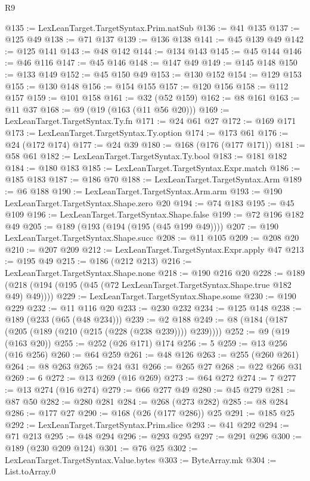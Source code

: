 \begin{lexlean}{R9}
\begin{coremodule}
@135 := LexLeanTarget.TargetSyntax.Prim.natSub
@136 := @41 @135
@137 := @125 @49
@138 := @71 @137
@139 := @136 @138
@141 := @45 @139 @49
@142 := @125 @141
@143 := @48 @142
@144 := @134 @143
@145 := @45 @144
@146 := @46 @116
@147 := @45 @146
@148 := @147 @49
@149 := @145 @148
@150 := @133 @149
@152 := @45 @150 @49
@153 := @130 @152
@154 := @129 @153
@155 := @130 @148
@156 := @154 @155
@157 := @120 @156
@158 := @112 @157
@159 := @101 @158
@161 := @32 (@52 @159)
@162 := @8 @161
@163 := @11 @37
@168 := @9 (@19 (@163 (@11 @56 @20)))
@169 := LexLeanTarget.TargetSyntax.Ty.fn
@171 := @24 @61 @27
@172 := @169 @171
@173 := LexLeanTarget.TargetSyntax.Ty.option
@174 := @173 @61
@176 := @24 (@172 @174)
@177 := @24 @39
@180 := @168 (@176 (@177 @171))
@181 := @58 @61
@182 := LexLeanTarget.TargetSyntax.Ty.bool
@183 := @181 @182
@184 := @180 @183
@185 := LexLeanTarget.TargetSyntax.Expr.match
@186 := @185 @183
@187 := @186 @70
@188 := LexLeanTarget.TargetSyntax.Arm
@189 := @6 @188
@190 := LexLeanTarget.TargetSyntax.Arm.arm
@193 := @190 LexLeanTarget.TargetSyntax.Shape.zero @20
@194 := @74 @183
@195 := @45 @109
@196 := LexLeanTarget.TargetSyntax.Shape.false
@199 := @72 @196 @182 @49
@205 := @189 (@193 (@194 (@195 (@45 @199 @49))))
@207 := @190 LexLeanTarget.TargetSyntax.Shape.succ
@208 := @11 @105
@209 := @208 @20
@210 := @207 @209
@212 := LexLeanTarget.TargetSyntax.Expr.apply @47
@213 := @195 @49
@215 := @186 (@212 @213)
@216 := LexLeanTarget.TargetSyntax.Shape.none
@218 := @190 @216 @20
@228 := @189 (@218 (@194 (@195 (@45 (@72 LexLeanTarget.TargetSyntax.Shape.true @182 @49) @49))))
@229 := LexLeanTarget.TargetSyntax.Shape.some
@230 := @190 @229
@232 := @11 @116 @20
@233 := @230 @232
@234 := @125 @148
@238 := @189 (@233 (@65 (@48 @234)))
@239 := @2 @188
@249 := @8 (@184 (@187 (@205 (@189 (@210 (@215 (@228 (@238 @239)))) @239))))
@252 := @9 (@19 (@163 @20))
@255 := @252 (@26 @171) @174
@256 := 5
@259 := @13 @256 (@16 @256)
@260 := @64 @259
@261 := @48 @126
@263 := @255 (@260 @261)
@264 := @8 @263
@265 := @24 @31
@266 := @265 @27
@268 := @22 @266 @31
@269 := 6
@272 := @13 @269 (@16 @269)
@273 := @64 @272
@274 := 7
@277 := @13 @274 (@16 @274)
@279 := @66 @277 @49
@280 := @45 @279
@281 := @87 @50
@282 := @280 @281
@284 := @268 (@273 @282)
@285 := @8 @284
@286 := @177 @27
@290 := @168 (@26 (@177 @286)) @25
@291 := @185 @25
@292 := LexLeanTarget.TargetSyntax.Prim.slice
@293 := @41 @292
@294 := @71 @213
@295 := @48 @294
@296 := @293 @295
@297 := @291 @296
@300 := @189 (@230 @209 @124)
@301 := @76 @25
@302 := LexLeanTarget.TargetSyntax.Value.bytes
@303 := ByteArray.mk
@304 := List.toArray.{0}

\end{coremodule}
\end{lexlean}

